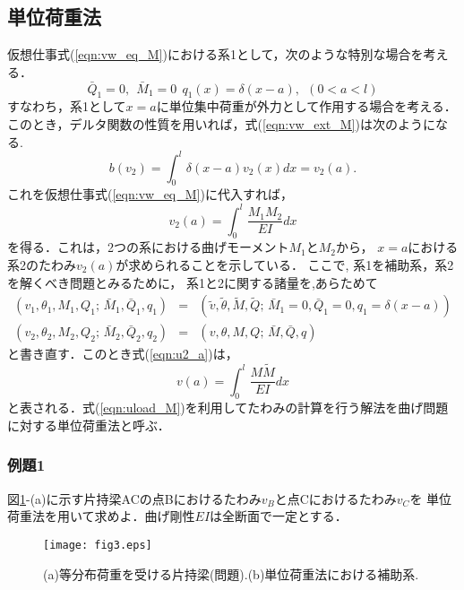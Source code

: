 \documentclass[10pt,a4j]{jarticle}
\begin{document}
\subsection{単位荷重法}
仮想仕事式(\ref{eqn:vw_eq_M})における系1として，次のような特別な場合を考える．
\begin{equation}
	\bar Q_1=0,\ \ \bar M_1=0\ \ q_1(x)=\delta(x-a), \ \ (0<a<l)
	\label{eqn:sys1_M}
\end{equation}
すなわち，系1として$x=a$に単位集中荷重が外力として作用する場合を考える．
このとき，デルタ関数の性質を用いれば，式(\ref{eqn:vw_ext_M})は次のようになる. 
\begin{equation}
	b(v_2)=\int_0^l \delta(x-a)v_2(x)dx= v_2(a).
	\label{eqn:vw_eq_dlt}
\end{equation}
これを仮想仕事式(\ref{eqn:vw_eq_M})に代入すれば，
\begin{equation}
	v_2(a)=\int_0^l \frac{M_1M_2}{EI}dx
	\label{eqn:u2_a}
\end{equation}
を得る．これは，2つの系における曲げモーメント$M_1$と$M_2$から，
$x=a$における系2のたわみ$v_2(a)$が求められることを示している．
ここで, 系1を補助系，系2を解くべき問題とみるために，
系1と2に関する諸量を,あらためて 
\begin{eqnarray}
	\left( v_1, \theta_1, M_1, Q_1;\, \bar M_1, \bar Q_1, q_1 \right)& = &
		\left(\tilde v, \tilde \theta, \tilde M, \tilde Q;\, 
		\bar M_1=0, \bar Q_1=0, q_1= \delta(x-a) \right) 
	\label{eqn:aux}
	\\
	\left( v_2, \theta_2, M_2, Q_2 ;\, \bar M_2, \bar Q_2, q_2 \right)& = &
		\left( v,\theta,M, Q;\, \bar M,\bar Q, q \right) 
	\label{eqn:prb_M}
\end{eqnarray}
と書き直す．このとき式(\ref{eqn:u2_a})は，
\begin{equation}
	v(a)=\int_0^l \frac{M \tilde M}{EI}dx
	\label{eqn:uload_M}
\end{equation}
と表される．式(\ref{eqn:uload_M})を利用してたわみの計算を行う解法を曲げ問題に対する単位荷重法と呼ぶ．
\subsubsection{例題1}
図\ref{fig:fig2_3}-(a)に示す片持梁ACの点Bにおけるたわみ$v_B$と点Cにおけるたわみ$v_C$を
単位荷重法を用いて求めよ．曲げ剛性$EI$は全断面で一定とする．
\begin{figure}[h]
	\begin{center}
	\texttt{[image: fig3.eps]} 
	\end{center}
	\caption{(a)等分布荷重を受ける片持梁(問題).(b)単位荷重法における補助系.} 
	\label{fig:fig2_3}
\end{figure}
\end{document}

